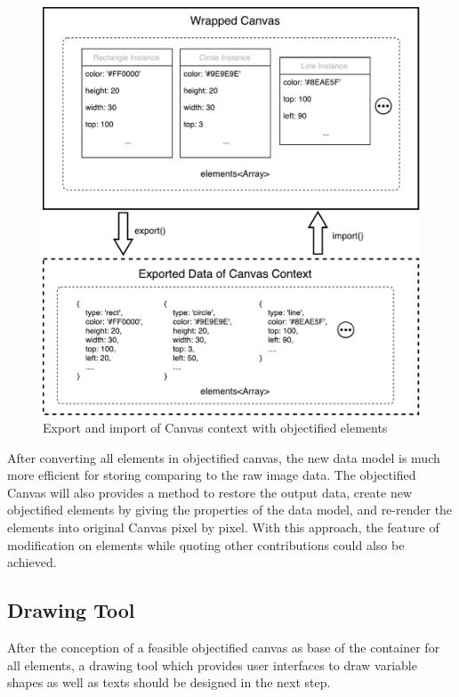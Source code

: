 \begin{figure}[!htbp]
  \centering
    \includegraphics[width=1\textwidth]{Figures/concept-wrapped-canvas-data.pdf}
  \caption{Export and import of Canvas context with objectified elements}
  \label{fig:objectified-canvas-data}
\end{figure}

After converting all elements in objectified canvas, the new data model is much more efficient for storing comparing to the raw image data. The objectified Canvas will also provides a method to restore the output data, create new objectified elements by giving the properties of the data model, and re-render the elements into original Canvas pixel by pixel. With this approach, the feature of modification on elements while quoting other contributions could also be achieved. 

\subsection{Drawing Tool}

After the conception of a feasible objectified canvas as base of the container for all elements, a drawing tool which provides user interfaces to draw variable shapes as well as texts should be designed in the next step. 

